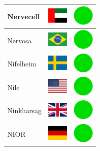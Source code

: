 \documentclass[12pt, a4paper, twoside]{report}
\begin{document}
\begin{center}
\begin{longtable}{|p{5cm}|p{2cm}|p{2cm}|}
Nervecell & \includegraphics[width=1cm]{4x3/ae} & \includegraphics[width=1cm]{likes/y} \\ \hline
Nervosa & \includegraphics[width=1cm]{4x3/br} & \includegraphics[width=1cm]{likes/y} \\ \hline
Nifelheim & \includegraphics[width=1cm]{4x3/se} & \includegraphics[width=1cm]{likes/y} \\ \hline
Nile & \includegraphics[width=1cm]{4x3/us} & \includegraphics[width=1cm]{likes/y} \\ \hline
Ninkharsag & \includegraphics[width=1cm]{4x3/gb} & \includegraphics[width=1cm]{likes/y} \\ \hline
NIOR & \includegraphics[width=1cm]{4x3/de} & \includegraphics[width=1cm]{likes/y} \\ \hline

\end{longtable}
\end{center}
\end{document}
